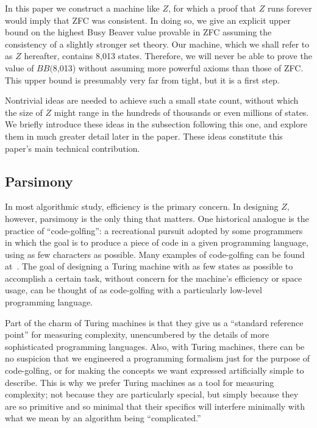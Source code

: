 \documentclass[11pt]{article}
\newcommand{\statenum}{8,013 }
\newcommand{\bbstatenum}{$BB($8,013) }
\begin{document}
In this paper we construct a machine like $Z$, for which a proof that $Z$ runs forever would imply that ZFC was consistent. In doing so, we give an explicit upper bound on the highest Busy Beaver value provable in ZFC assuming the consistency of a slightly stronger set theory. Our machine, which we shall refer to as $Z$ hereafter, contains \statenum states. Therefore, we will never be able to prove the value of \bbstatenum without assuming more powerful axioms than those of ZFC. This upper bound is presumably very far from tight, but it is a first step.

Nontrivial ideas are needed to achieve such a small state count, without which the size of $Z$ might range in the hundreds of thousands or even millions of states. We briefly introduce these ideas in the subsection following this one, and explore them in much greater detail later in the paper. These ideas constitute this paper's main technical contribution.

\subsection{Parsimony}

In most algorithmic study, efficiency is the primary concern. In designing $Z$, however, parsimony is the only thing that matters. One historical analogue is the practice of ``code-golfing'': a recreational pursuit adopted by some programmers in which the goal is to produce a piece of code in a given programming language, using as few characters as possible. Many examples of code-golfing can be found at~\cite{codegolf}. The goal of designing a Turing machine with as few states as possible to accomplish a certain task, without concern for the machine's efficiency or space usage, can be thought of as code-golfing with a particularly low-level programming language. 

Part of the charm of Turing machines is that they give us a ``standard reference point'' for measuring complexity, unencumbered by the details of more sophisticated programming languages. Also, with Turing machines, there can be no suspicion that we engineered a programming formalism just for the purpose of code-golfing, or for making the concepts we want expressed artificially simple to describe. This is why we prefer Turing machines as a tool for measuring complexity; not because they are particularly special, but simply because they are so primitive and so minimal that their specifics will interfere minimally with what we mean by an algorithm being ``complicated.''
\end{document}

